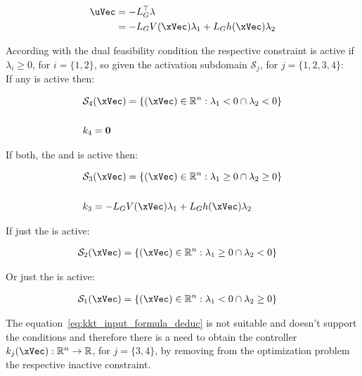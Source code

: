 \begin{align}
    \uVec &= -L_G^{\top}\lambda \notag \\
    &= -L_GV(\xVec)\lambda_1 + L_Gh(\xVec)\lambda_2
    \label{eq:kkt_input_formula_deduc}
\end{align}

According with the dual feasibility condition the respective constraint is active if \(\lambda_i \geq 0\), for \(i = \{1,2\}\), so given the activation subdomain \(\mathcal{S}_j\), for \(j = \{1,2,3,4\}\): \\

If any is active then:

\begin{align}
    &\mathcal{S}_4 (\xVec) = \{ (\xVec) \in \mathbb{R}^n: \lambda_1 < 0 \cap \lambda_2 < 0 \}  \label{eq:anyConstraintsActvCond}  \\
    \notag \\
    &k_4 = \mathbf{0} \label{eq:anyConstraintsActvController} 
\end{align}

If both, the  and  is active then:

\begin{align}
    &\mathcal{S}_3 (\xVec) = \{ (\xVec) \in \mathbb{R}^n: \lambda_1 \geq 0 \cap \lambda_2 \geq 0 \}  \label{eq:bothConstraintsActvCond}\\
    \notag \\
    &k_3 = -L_GV(\xVec)\lambda_1 + L_Gh(\xVec)\lambda_2 \label{eq:bothConstraintsActvController} 
\end{align}


If just the  is active:

\begin{align}
    &\mathcal{S}_2 (\xVec) = \{ (\xVec) \in \mathbb{R}^n: \lambda_1 \geq 0 \cap \lambda_2 < 0 \}  \label{eq:CBFConstraintsActvCond}
\end{align}

Or just the  is active:

\begin{align}
    &\mathcal{S}_1 (\xVec) = \{ (\xVec) \in \mathbb{R}^n: \lambda_1 < 0 \cap \lambda_2 \geq 0 \}  \label{eq:CLFConstraintsActvCond}
\end{align}

The equation~\ref{eq:kkt_input_formula_deduc} is not suitable and doesn't support the  conditions and therefore there is a need to obtain the controller \(k_j(\xVec): \mathbb{R}^n \to \mathbb{R}\), for \(j = \{3,4\}\), by removing from the optimization problem the respective inactive constraint. \\


